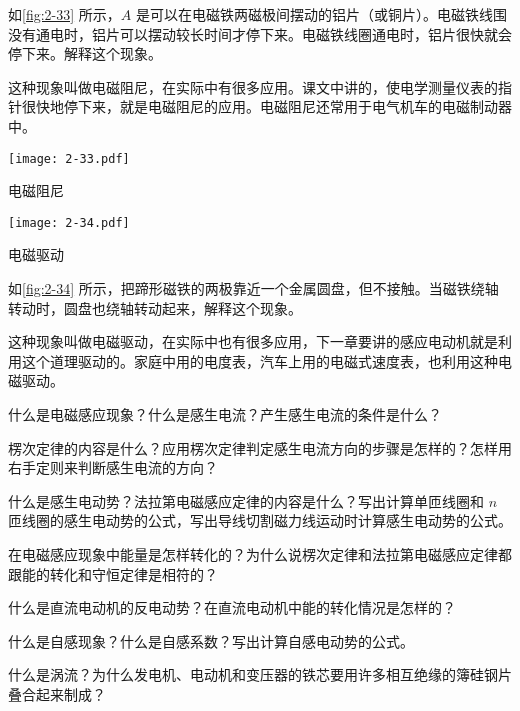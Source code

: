 \begin{Practice}
\begin{question}
  \item 如\cref{fig:2-33} 所示，$A$ 是可以在电磁铁两磁极间摆动的铝片（或铜片）。电磁铁线围没有通电时，铝片可以摆动较长时间才停下来。电磁铁线圈通电时，铝片很快就会停下来。解释这个现象。
    
  这种现象叫做电磁阻尼，在实际中有很多应用。课文中讲的，使电学测量仪表的指针很快地停下来，就是电磁阻尼的应用。电磁阻尼还常用于电气机车的电磁制动器中。
  \begin{figurehere}
    \begin{minipage}{\linewidth}
    \begin{minipage}[b]{0.45\linewidth}\centering
      \texttt{[image: 2-33.pdf]}
      \caption{电磁阻尼}\label{fig:2-33}
    \end{minipage}
    \begin{minipage}[b]{0.5\linewidth}\centering
      \texttt{[image: 2-34.pdf]}
      \caption{电磁驱动}\label{fig:2-34}
    \end{minipage}
    \end{minipage}
  \end{figurehere}
  \item 如\cref{fig:2-34} 所示，把蹄形磁铁的两极靠近一个金属圆盘，但不接触。当磁铁绕轴转动时，圆盘也绕轴转动起来，解释这个现象。

  这种现象叫做电磁驱动，在实际中也有很多应用，下一章要讲的感应电动机就是利用这个道理驱动的。家庭中用的电度表，汽车上用的电磁式速度表，也利用这种电磁驱动。
\end{question}
\end{Practice}

\begin{Review}
\begin{question}
  \item 什么是电磁感应现象？什么是感生电流？产生感生电流的条件是什么？
  \item 楞次定律的内容是什么？应用楞次定律判定感生电流方向的步骤是怎样的？怎样用右手定则来判断感生电流的方向？
  \item 什么是感生电动势？法拉第电磁感应定律的内容是什么？写出计算单匝线圈和 $n$ 匝线圈的感生电动势的公式，写出导线切割磁力线运动时计算感生电动势的公式。
  \item 在电磁感应现象中能量是怎样转化的？为什么说楞次定律和法拉第电磁感应定律都跟能的转化和守恒定律是相符的？
  \item 什么是直流电动机的反电动势？在直流电动机中能的转化情况是怎样的？
  \item 什么是自感现象？什么是自感系数？写出计算自感电动势的公式。
  \item 什么是涡流？为什么发电机、电动机和变压器的铁芯要用许多相互绝缘的簿硅钢片叠合起来制成？
\end{question}
\end{Review}

